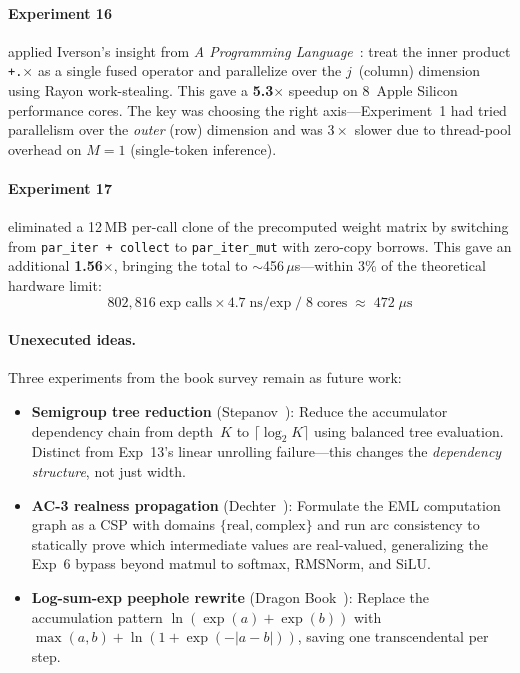\documentclass[acmsmall,nonacm]{acmart}
\begin{document}
\paragraph{Experiment 16} applied Iverson's insight from \emph{A
Programming Language}~\cite{iverson1962}: treat the inner product
\texttt{+.$\times$} as a single fused operator and parallelize over the
$j$~(column) dimension using Rayon work-stealing.  This gave a
\textbf{5.3$\times$} speedup on 8~Apple Silicon performance cores.
The key was choosing the right axis---Experiment~1 had tried
parallelism over the \emph{outer} (row) dimension and was $3\times$
slower due to thread-pool overhead on $M{=}1$ (single-token inference).

\paragraph{Experiment 17} eliminated a 12\,MB per-call clone of the
precomputed weight matrix by switching from \texttt{par\_iter +
collect} to \texttt{par\_iter\_mut} with zero-copy borrows.  This
gave an additional \textbf{1.56$\times$}, bringing the total to
$\sim$456\,$\mu$s---within 3\% of the theoretical hardware limit:
\[
  802{,}816 \;\text{exp calls} \times 4.7\;\text{ns/exp} \;/\; 8\;\text{cores}
  \;\approx\; 472\;\mu\text{s}
\]

\paragraph{Unexecuted ideas.}  Three experiments from the book survey
remain as future work:

\begin{itemize}
\item \textbf{Semigroup tree reduction} (Stepanov~\cite{stepanov2009}):
  Reduce the accumulator dependency chain from depth~$K$ to
  $\lceil\log_2 K\rceil$ using balanced tree evaluation.  Distinct from
  Exp~13's linear unrolling failure---this changes the \emph{dependency
  structure}, not just width.

\item \textbf{AC-3 realness propagation} (Dechter~\cite{dechter2003}):
  Formulate the EML computation graph as a CSP with domains
  $\{\text{real}, \text{complex}\}$ and run arc consistency to
  statically prove which intermediate values are real-valued, generalizing
  the Exp~6 bypass beyond matmul to softmax, RMSNorm, and SiLU.

\item \textbf{Log-sum-exp peephole rewrite} (Dragon
  Book~\cite{dragonbook}): Replace the accumulation pattern
  $\ln(\exp(a) + \exp(b))$ with $\max(a,b) + \ln(1 + \exp(-|a-b|))$,
  saving one transcendental per step.
\end{itemize}
\end{document}
